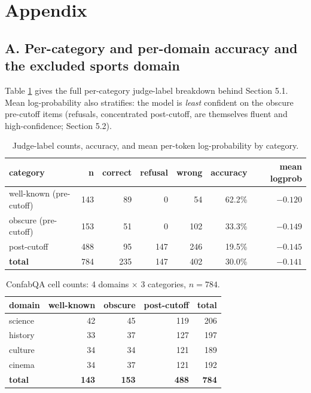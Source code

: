 \section{Appendix}\label{appendix}

\subsection{A. Per-category and per-domain accuracy and the excluded
sports domain}\label{a.-per-domain-accuracy-and-the-excluded-sports-domain}

Table \ref{tbl:bycategory} gives the full per-category judge-label
breakdown behind Section 5.1. Mean log-probability also stratifies: the
model is \emph{least} confident on the obscure pre-cutoff items
(refusals, concentrated post-cutoff, are themselves fluent and
high-confidence; Section 5.2).

\begin{table}[!htbp]
\small
\centering
\caption{Judge-label counts, accuracy, and mean per-token log-probability by
category.\label{tbl:bycategory}}
\begin{tabular}{@{}lrrrrrr@{}}
\toprule
category & n & correct & refusal & wrong & accuracy & mean logprob \\\midrule
well-known (pre-cutoff) & 143 & 89 & 0 & 54 & 62.2\% & \(-0.120\) \\
obscure (pre-cutoff) & 153 & 51 & 0 & 102 & 33.3\% & \(-0.149\) \\
post-cutoff & 488 & 95 & 147 & 246 & 19.5\% & \(-0.145\) \\
\midrule
\textbf{total} & 784 & 235 & 147 & 402 & 30.0\% & \(-0.141\) \\
\bottomrule
\end{tabular}
\end{table}

\begin{table}[!htbp]
\small
\centering
\caption{ConfabQA cell counts: 4 domains \(\times\) 3 categories,
\(n = 784\).\label{tbl:cells}}
\begin{tabular}{@{}lrrrr@{}}
\toprule
domain & well-known & obscure & post-cutoff & total \\\midrule
science & 42 & 45 & 119 & 206 \\
history & 33 & 37 & 127 & 197 \\
culture & 34 & 34 & 121 & 189 \\
cinema & 34 & 37 & 121 & 192 \\
\textbf{total} & \textbf{143} & \textbf{153} & \textbf{488} &
\textbf{784} \\
\bottomrule
\end{tabular}
\end{table}

